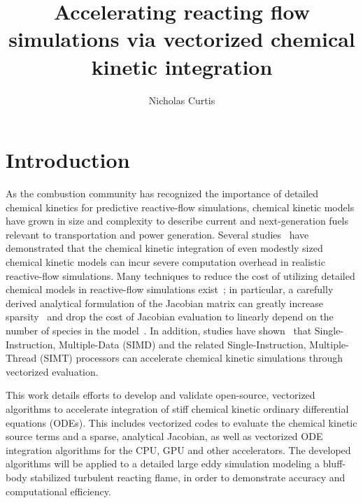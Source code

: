 \documentclass[a4paper,10pt]{article}
\title{Accelerating reacting flow simulations via vectorized chemical kinetic integration}
\author{Nicholas Curtis}
\begin{document}
\maketitle

\section*{Introduction}
As the combustion community has recognized the importance of detailed chemical kinetics for predictive reactive-flow simulations, chemical kinetic models have grown in size and complexity to describe current and next-generation fuels relevant to transportation and power generation.
Several studies~\cite{Huang20091814,Bottone2012,Moiz2016123} have demonstrated that the chemical kinetic integration of even modestly sized chemical kinetic models can incur severe computation overhead in realistic reactive-flow simulations.
Many techniques to reduce the cost of utilizing detailed chemical models in reactive-flow simulations exist~\cite{LU2009192}; in particular, a carefully derived analytical formulation of the Jacobian matrix can greatly increase sparsity~\cite{SCHWER2002270} and drop the cost of Jacobian evaluation to linearly depend on the number of species in the model~\cite{LU2009192}.
In addition, studies have shown~\cite{STONE201818} that Single-Instruction, Multiple-Data (SIMD) and the related Single-Instruction, Multiple-Thread (SIMT) processors can accelerate chemical kinetic simulations through vectorized evaluation.

This work details efforts to develop and validate open-source, vectorized algorithms to accelerate integration of stiff chemical kinetic ordinary differential equations (ODEs).
This includes vectorized codes to evaluate the chemical kinetic source terms and a sparse, analytical Jacobian, as well as vectorized ODE integration algorithms for the CPU, GPU and other accelerators.
The developed algorithms will be applied to a detailed large eddy simulation modeling a bluff-body stabilized turbulent reacting flame, in order to demonstrate accuracy and computational efficiency.
\end{document}
